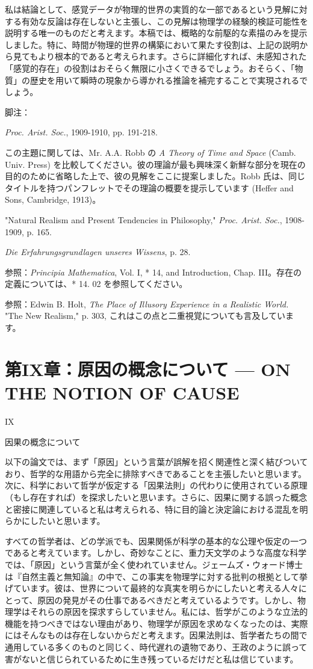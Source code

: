 \documentclass[a4paper,11pt,openany]{ltjsbook}
\begin{document}
私は結論として、感覚データが物理的世界の実質的な一部であるという見解に対する有効な反論は存在しないと主張し、この見解は物理学の経験的検証可能性を説明する唯一のものだと考えます。本稿では、概略的な前駆的な素描のみを提示しました。特に、時間が物理的世界の構築において果たす役割は、上記の説明から見てもより根本的であると考えられます。さらに詳細化すれば、未感知された「感覚的存在」の役割はおそらく無限に小さくできるでしょう。おそらく、「物質」の歴史を用いて瞬時の現象から導かれる推論を補完することで実現されるでしょう。

脚注：

 \textit{Proc. Arist. Soc.}, 1909-1910, pp. 191-218.

 この主題に関しては、Mr. A.A. Robb の \textit{A Theory of Time and Space} (Camb. Univ. Press) を比較してください。彼の理論が最も興味深く新鮮な部分を現在の目的のために省略した上で、彼の見解をここに提案しました。Robb 氏は、同じタイトルを持つパンフレットでその理論の概要を提示しています (Heffer and Sons, Cambridge, 1913)。

 "Natural Realism and Present Tendencies in Philosophy," \textit{Proc. Arist. Soc.}, 1908-1909, p. 165.

 \textit{Die Erfahrungsgrundlagen unseres Wissens}, p. 28.

 参照：\textit{Principia Mathematica}, Vol. I, * 14, and Introduction, Chap. III。存在の定義については、* 14. 02 を参照してください。

 参照：Edwin B. Holt, \textit{The Place of Illusory Experience in a Realistic World.} "The New Realism," p. 303, これはこの点と二重視覚についても言及しています。


\chapter{第IX章：原因の概念について --- {ON THE NOTION OF CAUSE}}

IX

因果の概念について


以下の論文では、まず「原因」という言葉が誤解を招く関連性と深く結びついており、哲学的な用語から完全に排除すべきであることを主張したいと思います。次に、科学において哲学が仮定する「因果法則」の代わりに使用されている原理（もし存在すれば）を探求したいと思います。さらに、因果に関する誤った概念と密接に関連していると私は考えられる、特に目的論と決定論における混乱を明らかにしたいと思います。

すべての哲学者は、どの学派でも、因果関係が科学の基本的な公理や仮定の一つであると考えています。しかし、奇妙なことに、重力天文学のような高度な科学では、「原因」という言葉が全く使われていません。ジェームズ・ウォード博士は『自然主義と無知論』の中で、この事実を物理学に対する批判の根拠として挙げています。彼は、世界について最終的な真実を明らかにしたいと考える人々にとって、原因の発見がその仕事であるべきだと考えているようです。しかし、物理学はそれらの原因を探求すらしていません。私には、哲学がこのような立法的機能を持つべきではない理由があり、物理学が原因を求めなくなったのは、実際にはそんなものは存在しないからだと考えます。因果法則は、哲学者たちの間で通用している多くのものと同じく、時代遅れの遺物であり、王政のように誤って害がないと信じられているために生き残っているだけだと私は信じています。
\end{document}
